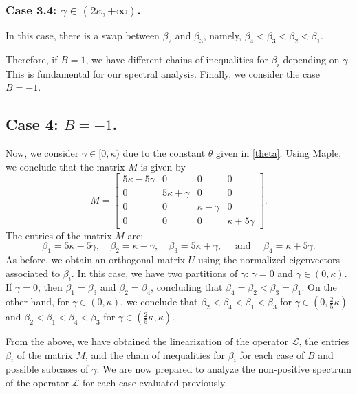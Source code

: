 \documentclass[10pt,reqno,a4paper]{amsart} %
\theoremstyle{definition} %
\numberwithin{equation}{section}
\numberwithin{figure}{section}
\begin{document}
\subsubsection*{Case 3.4: $\gamma \in (2\kappa, +\infty)$.} 
In this case, there is a swap between $\beta_2$ and $\beta_3$, namely, $\beta_4 < \beta_3 < \beta_2 < \beta_1$.

Therefore, if $B = 1$, we have different chains of inequalities for $\beta_i$ depending on $\gamma$. This is fundamental for our spectral analysis. Finally, we consider the case $B = -1$.

\subsection*{Case 4: $B = -1$.} 
Now, we consider $\gamma \in [0,\kappa)$ due to the constant $\theta$ given in \eqref{theta}. Using Maple, we conclude that the matrix $M$ is given by
\begin{equation*}
M= \begin{bmatrix}
5\kappa-5\gamma & 0 & 0 & 0 \\ 
0 & 5\kappa+\gamma & 0 & 0 \\ 
0 & 0 & \kappa-\gamma & 0 \\ 
0 & 0 & 0 & \kappa+5\gamma
\end{bmatrix}.
\end{equation*}
The entries of the matrix $M$ are:
\begin{equation}
    \beta_1 = 5\kappa - 5\gamma, \quad \beta_2 = \kappa-\gamma, \quad \beta_3 = 5\kappa+\gamma, \quad \text{ and } \quad \beta_4 = \kappa + 5 \gamma.
\end{equation}
As before, we obtain an orthogonal matrix $U$ using the normalized eigenvectors associated to $\beta_i$. In this case, we have two partitions of $\gamma$: $\gamma = 0$ and $\gamma \in (0,\kappa)$. If $\gamma = 0$, then $\beta_1 = \beta_3$ and $\beta_2 = \beta_4$, concluding that $\beta_4 = \beta_2 < \beta_3 = \beta_1$. On the other hand, for $\gamma \in (0,\kappa)$, we conclude that $\beta_2 < \beta_4 < \beta_1 < \beta_3$ for $\gamma \in \left(0, \frac{2}{5} \kappa\right)$ and $\beta_2 < \beta_1 < \beta_4 < \beta_3$ for $\gamma \in \left(\frac{2}{5}\kappa, \kappa\right)$.

From the above, we have obtained the linearization of the operator $\mathcal{L}$, the entries $\beta_i$ of the matrix $M$, and the chain of inequalities for $\beta_i$ for each case of $B$ and possible subcases of $\gamma$. We are now prepared to analyze the non-positive spectrum of the operator $\mathcal{L}$ for each case evaluated previously.
\end{document}
